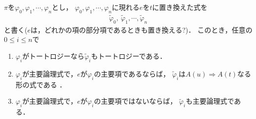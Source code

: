 	$\pi$を$\varphi_{0},\varphi_{1},\cdots,\varphi_{n}$とし，
	$\varphi_{0},\varphi_{1},\cdots,\varphi_{n}$に現れる$e$を$t$に置き換えた式を
	\begin{align}
		\tilde{\varphi}_{0},\ \tilde{\varphi}_{1},\cdots, \tilde{\varphi}_{n}
	\end{align}
	と書く($e$は，どれかの項の部分項であるときも置き換える?)．
	このとき，任意の$0 \leq i \leq n$で
	\begin{enumerate}
		\item $\varphi_{i}$がトートロジーなら$\tilde{\varphi}_{i}$もトートロジーである．
		\item $\varphi_{i}$が主要論理式で，$e$が$\varphi_{i}$の主要項であるならば，
			$\tilde{\varphi}_{i}$は$A(u) \Longrightarrow A(t)$なる形の式である
			\footnotemark．
		\item $\varphi_{i}$が主要論理式で，$e$が$\varphi_{i}$の主要項ではないならば，
			$\tilde{\varphi}_{i}$も主要論理式である．
	\end{enumerate}
	
	
